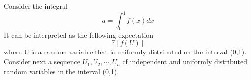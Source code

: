 \documentclass[12pt,twoside, letter]{exam}
\theoremstyle{definition}
\newcommand{\ee}{\mathbb{E}}
\begin{document}


\par{Consider the integral}
  \begin{equation*}
    a = \int^1_0 f(x) dx
  \end{equation*}
It can be interpreted as the following expectation
  \begin{equation*}
    \ee[f(U)]
  \end{equation*}
where U is a random variable that is uniformly distributed on the interval (0,1). Consider next a sequence $U_1, U_2, \cdots, U_n$ of independent and uniformly distributed
random variables in the interval (0,1).
\end{document}
